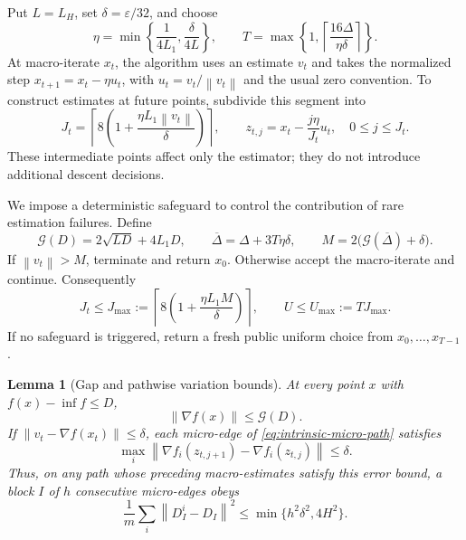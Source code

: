 \documentclass[11pt,a4paper]{article}
\newcommand{\eps}{\varepsilon}
\newcommand{\norm}[1]{\left\lVert #1\right\rVert}
\newtheorem{lemma}[theorem]{Lemma}
\theoremstyle{remark}
\begin{document}
Put $L=L_H$, set $\delta=\eps/32$, and choose
\begin{equation}
 \eta=\min\left\{\frac1{4L_1},\frac{\delta}{4L}\right\},
 \qquad
 T=\max\left\{1,\left\lceil\frac{16\Delta}{\eta\delta}\right\rceil\right\}.
 \label{eq:dyadic-macro-parameters}
\end{equation}
At macro-iterate $x_t$, the algorithm uses an estimate $v_t$ and takes the
normalized step $x_{t+1}=x_t-\eta u_t$, with
$u_t=v_t/\norm{v_t}$ and the usual zero convention.  To construct estimates
at future points, subdivide this segment into
\begin{equation}
 J_t=\left\lceil8\left(1+
                 \frac{\eta L_1\norm{v_t}}{\delta}\right)\right\rceil,
 \qquad
 z_{t,j}=x_t-\frac{j\eta}{J_t}u_t,
 \quad 0\le j\le J_t.
 \label{eq:intrinsic-micro-path}
\end{equation}
These intermediate points affect only the estimator; they do not introduce
additional descent decisions.

We impose a deterministic safeguard to control the contribution of rare
estimation failures.  Define
\begin{equation}
 \mathcal G(D)=2\sqrt{LD}+4L_1D,\qquad
 \overline\Delta=\Delta+3T\eta\delta,\qquad
 M=2\bigl(\mathcal G(\overline\Delta)+\delta\bigr).
 \label{eq:dyadic-safeguard}
\end{equation}
If $\norm{v_t}>M$, terminate and return $x_0$.  Otherwise accept the
macro-iterate and continue.  Consequently
\begin{equation}
 J_t\le J_{\max}:=
 \left\lceil8\left(1+\frac{\eta L_1M}{\delta}\right)\right\rceil,
 \qquad U\le U_{\max}:=TJ_{\max}.
 \label{eq:dyadic-deterministic-cap}
\end{equation}
If no safeguard is triggered, return a fresh public uniform choice from
$x_0,\ldots,x_{T-1}$.

\begin{lemma}[Gap and pathwise variation bounds]
\label{lem:micro-variation}
At every point $x$ with $f(x)-\inf f\le D$,
\begin{equation}
 \norm{\nabla f(x)}\le\mathcal G(D).
 \label{eq:gap-gradient-envelope}
\end{equation}
If $\norm{v_t-\nabla f(x_t)}\le\delta$, each micro-edge of
\eqref{eq:intrinsic-micro-path} satisfies
\begin{equation}
 \max_i\norm{\nabla f_i(z_{t,j+1})-
                      \nabla f_i(z_{t,j})}\le\delta.
 \label{eq:micro-edge-variation}
\end{equation}
Thus, on any path whose preceding macro-estimates satisfy this error bound,
a block $I$ of $h$ consecutive micro-edges obeys
\begin{equation}
 \frac1m\sum_i\norm{D^i_I-D_I}^2
 \le\min\{h^2\delta^2,4H^2\}.
 \label{eq:block-variation}
\end{equation}
\end{lemma}
\end{document}
